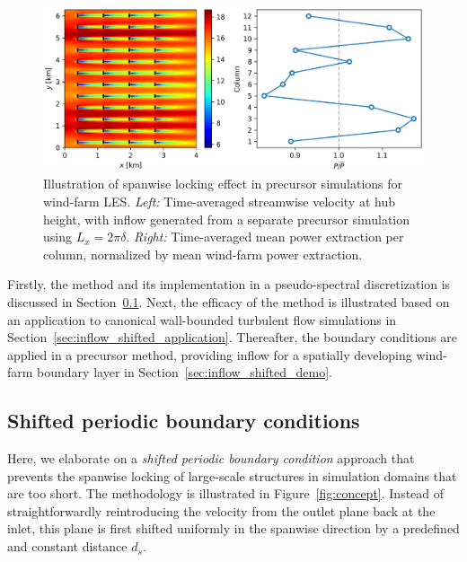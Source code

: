 \begin{figure}
	\centering 
	\includegraphics[width=\textwidth]{chapters/turbulent_inflow/illustrate_lock}
	\caption{Illustration of spanwise locking effect in precursor simulations for wind-farm LES. \emph{Left: } Time-averaged streamwise velocity at hub height, with inflow generated from a separate precursor simulation using $L_x=2\pi\delta$. \emph{Right: } Time-averaged mean power extraction per column, normalized by mean wind-farm power extraction. \label{fig:inflow_illustrate_lock}}
\end{figure}

Firstly, the method and its implementation in a pseudo-spectral discretization is discussed in Section~\ref{sec:inflow_shifted_shifted}. Next, the efficacy of the method is illustrated based on an application to canonical wall-bounded turbulent flow simulations in Section~\ref{sec:inflow_shifted_application}. Thereafter, the boundary conditions are applied in a precursor method, providing inflow for a spatially developing wind-farm boundary layer in Section~\ref{sec:inflow_shifted_demo}.

	\subsection{Shifted periodic boundary conditions}\label{sec:inflow_shifted_shifted}
	Here, we elaborate on a \emph{shifted periodic boundary condition} approach that prevents the spanwise locking of large-scale structures in simulation domains that are too short. The methodology is illustrated in Figure~\ref{fig:concept}. Instead of straightforwardly reintroducing the velocity from the outlet plane back at the inlet, this plane is first shifted uniformly in the spanwise direction by a predefined and constant distance $d_s$. 
	
